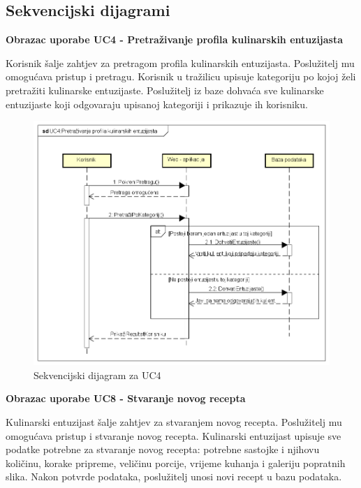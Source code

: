 			\subsection{Sekvencijski dijagrami}
				
				\begin{large}{\textbf{Obrazac uporabe UC4 - Pretraživanje profila kulinarskih entuzijasta}}\end{large}
				
				Korisnik šalje zahtjev za pretragom profila kulinarskih entuzijasta. Poslužitelj mu omogućava pristup i pretragu. Korisnik u tražilicu upisuje kategoriju po kojoj želi pretražiti kulinarske entuzijaste. Poslužitelj iz baze dohvaća sve kulinarske entuzijaste koji odgovaraju upisanoj kategoriji i prikazuje ih korisniku.
				
					
				\begin{figure}[H]
			\includegraphics[scale=0.4]{dijagrami/SEQ_UC4.png} %
			\centering
			\caption{Sekvencijski dijagram za UC4}
			\label{SEQ_UC4}
		\end{figure}
	

				\begin{large}{\textbf{Obrazac uporabe UC8 - Stvaranje novog recepta}}\end{large}
				
				Kulinarski entuzijast šalje zahtjev za stvaranjem novog recepta. Poslužitelj mu omogućava pristup i stvaranje novog recepta. Kulinarski entuzijast upisuje sve podatke potrebne za stvaranje novog recepta: potrebne sastojke i njihovu količinu, korake pripreme, veličinu porcije, vrijeme kuhanja i galeriju popratnih slika. Nakon potvrde podataka, poslužitelj unosi novi recept u bazu podataka.
				
